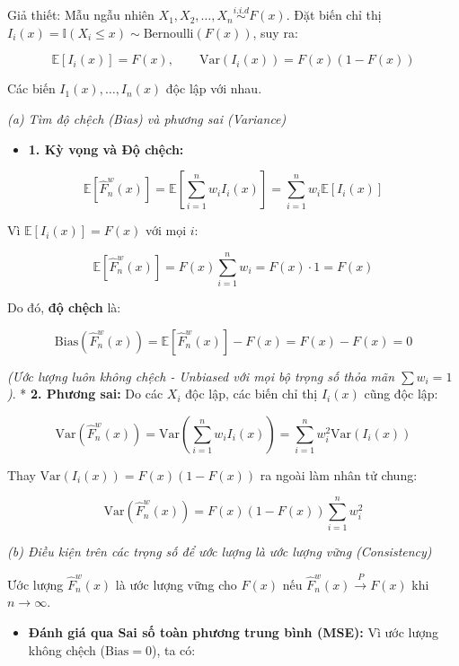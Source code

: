 \documentclass[12pt,a4paper]{article}
\begin{document}
Giả thiết: Mẫu ngẫu nhiên \(X_1, X_2, \dots, X_n \overset{i.i.d}{\sim} F(x)\).
Đặt biến chỉ thị \(I_i(x) = \mathbb{I}(X_i \le x) \sim \text{Bernoulli}(F(x))\), suy ra:

\[\mathbb{E}[I_i(x)] = F(x), \qquad \text{Var}(I_i(x)) = F(x)(1 - F(x))\]

Các biến \(I_1(x), \dots, I_n(x)\) độc lập với nhau.

\emph{(a) Tìm độ chệch (Bias) và phương sai (Variance)}

\begin{itemize}

\item
  \textbf{1. Kỳ vọng và Độ chệch:}
\end{itemize}

\[\mathbb{E}\left[\widehat{F}_n^w(x)\right] = \mathbb{E}\left[ \sum_{i=1}^n w_i I_i(x) \right] = \sum_{i=1}^n w_i \mathbb{E}[I_i(x)]\]

Vì \(\mathbb{E}[I_i(x)] = F(x)\) với mọi \(i\):

\[\mathbb{E}\left[\widehat{F}_n^w(x)\right] = F(x) \sum_{i=1}^n w_i = F(x) \cdot 1 = F(x)\]

Do đó, \textbf{độ chệch} là:

\[\text{Bias}\left(\widehat{F}_n^w(x)\right) = \mathbb{E}\left[\widehat{F}_n^w(x)\right] - F(x) = F(x) - F(x) = 0\]

\emph{(Ước lượng luôn không chệch - Unbiased với mọi bộ trọng số thỏa mãn \(\sum w_i = 1\))}.
* \textbf{2. Phương sai:}
Do các \(X_i\) độc lập, các biến chỉ thị \(I_i(x)\) cũng độc lập:

\[\text{Var}\left(\widehat{F}_n^w(x)\right) = \text{Var}\left( \sum_{i=1}^n w_i I_i(x) \right) = \sum_{i=1}^n w_i^2 \text{Var}(I_i(x))\]

Thay \(\text{Var}(I_i(x)) = F(x)(1 - F(x))\) ra ngoài làm nhân tử chung:

\[\text{Var}\left(\widehat{F}_n^w(x)\right) = F(x)(1 - F(x)) \sum_{i=1}^n w_i^2\]

\emph{(b) Điều kiện trên các trọng số để ước lượng là ước lượng vững (Consistency)}

Ước lượng \(\widehat{F}_n^w(x)\) là ước lượng vững cho \(F(x)\) nếu \(\widehat{F}_n^w(x) \xrightarrow{P} F(x)\) khi \(n \to \infty\).

\begin{itemize}

\item
  \textbf{Đánh giá qua Sai số toàn phương trung bình (MSE):}
  Vì ước lượng không chệch (\(\text{Bias} = 0\)), ta có:
\end{itemize}
\end{document}

